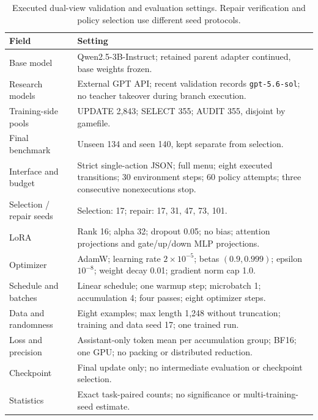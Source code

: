 \begin{table}[!htbp]
\caption{Executed dual-view validation and evaluation settings. Repair
verification and policy selection use different seed protocols.}
\label{tab:config}\centering\small
\begin{tabularx}{\linewidth}{L{1.6in}X}\toprule
Field & Setting\\\midrule
Base model & Qwen2.5-3B-Instruct; retained parent adapter continued, base weights frozen.\\
Research models & External GPT API; recent validation records \texttt{gpt-5.6-sol}; no teacher takeover during branch execution.\\
Training-side pools & UPDATE 2,843; SELECT 355; AUDIT 355, disjoint by gamefile.\\
Final benchmark & Unseen 134 and seen 140, kept separate from selection.\\
Interface and budget & Strict single-action JSON; full menu; eight executed transitions; 30 environment steps; 60 policy attempts; three consecutive nonexecutions stop.\\
Selection / repair seeds & Selection: 17; repair: 17, 31, 47, 73, 101.\\
LoRA & Rank 16; alpha 32; dropout 0.05; no bias; attention projections and gate/up/down MLP projections.\\
Optimizer & AdamW; learning rate $2\!\times\!10^{-5}$; betas $(0.9,0.999)$; epsilon $10^{-8}$; weight decay 0.01; gradient norm cap 1.0.\\
Schedule and batches & Linear schedule; one warmup step; microbatch 1; accumulation 4; four passes; eight optimizer steps.\\
Data and randomness & Eight examples; max length 1,248 without truncation; training and data seed 17; one trained run.\\
Loss and precision & Assistant-only token mean per accumulation group; BF16; one GPU; no packing or distributed reduction.\\
Checkpoint & Final update only; no intermediate evaluation or checkpoint selection.\\
Statistics & Exact task-paired counts; no significance or multi-training-seed estimate.\\\bottomrule
\end{tabularx}
\end{table}

